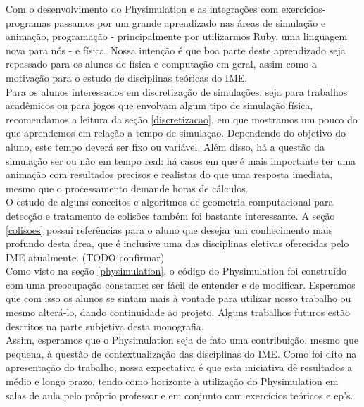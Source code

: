 
Com o desenvolvimento do Physimulation e as integrações com exercícios-programas passamos por um grande aprendizado nas áreas de simulação e animação, programação - principalmente por utilizarmos Ruby, uma linguagem nova para nós - e física. Nossa intenção é que boa parte deste aprendizado seja repassado para os alunos de física e computação em geral, assim como a motivação para o estudo de disciplinas teóricas do IME. \\

Para os alunos interessados em discretização de simulações, seja para trabalhos acadêmicos ou para jogos que envolvam algum tipo de simulação física, recomendamos a leitura da seção \ref{discretizacao}, em que mostramos um pouco do que aprendemos em relação a tempo de simulaçao. Dependendo do objetivo do aluno, este tempo deverá ser fixo ou variável. Além disso, há a questão da simulação ser ou não em tempo real: há casos em que é mais importante ter uma animação com resultados precisos e realistas do que uma resposta imediata, mesmo que o processamento demande horas de cálculos. \\

O estudo de alguns conceitos e algoritmos de geometria computacional para detecção e tratamento de colisões também foi bastante interessante. A seção \ref{colisoes} possui referências para o aluno que desejar um conhecimento mais profundo desta área, que é inclusive uma das disciplinas eletivas oferecidas pelo IME atualmente. (TODO confirmar) \\

Como visto na seção \ref{physimulation}, o código do Physimulation foi construído com uma preocupação constante: ser fácil de entender e de modificar. Esperamos que com isso os alunos se sintam mais à vontade para utilizar nosso trabalho ou mesmo alterá-lo, dando continuidade ao projeto. Alguns trabalhos futuros estão descritos na parte subjetiva desta monografia. \\

Assim, esperamos que o Physimulation seja de fato uma contribuição, mesmo que pequena, à questão de contextualização das disciplinas do IME. Como foi dito na apresentação do trabalho, nossa expectativa é que esta iniciativa dê resultados a médio e longo prazo, tendo como horizonte a utilização do Physimulation em salas de aula pelo próprio professor e em conjunto com exercícios teóricos e ep's.
